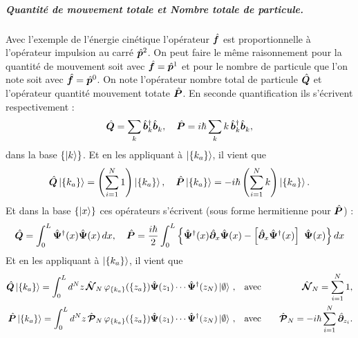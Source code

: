 \subparagraph{Quantité de mouvement totale et Nombre totale de particule. }
Avec l'exemple de l'énergie cinétique l'opérateur $\hat{\bm{f}}$ est  proportionnelle à l'opérateur impulsion au carré $\hat{\bm{p}}^2$. On peut faire le même raisonnement pour la quantité de mouvement  soit avec $\hat{\bm{f}} = \hat{\bm{p}}^1$ et pour le nombre de particule que l'on note soit avec $\hat{\bm{f}} = \hat{\bm{p}}^0$. On note l'opérateur nombre total de particule $\hat{\bm{Q}}$  et l'opérateur quantité mouvement totate $\hat{\bm{P}}$. En seconde quantification ils s'écrivent respectivement :  
\begin{equation}
	\hat{\bm{Q}} = \sum_{k}  \hat{\bm{b}}^\dagger_k \hat{\bm{b}}_k^{} , \quad  \hat{\bm{P}} = i\hbar\sum_{k} k \, \hat{\bm{b}}^\dagger_k \hat{\bm{b}}_k^{},\label{eq.chap.1.Q.P.k.1}
\end{equation}
dans la base \( \{ \ket{k} \} \). Et en les appliquant à \(\ket{\{k_a\}}\), il vient que 
\begin{eqnarray}
	\hat{\bm{Q}} \ket{\{k_a\}} = \left( \sum_{i = 1}^N 1 \right) \ket{\{k_a\}},\quad \hat{\bm{P}} \ket{\{k_a\}} = -i\hbar \left( \sum_{i = 1}^N k \right) \ket{\{k_a\}}.
\end{eqnarray}
Et dans la base \( \{ \ket{x} \} \) ces opérateurs s'écrivent (sous forme hermitienne pour $\hat{\bm{P}}$) : 
\begin{eqnarray}
	\operator{Q}  =  \int_0^L \operator{\Psi}^\dag (x) \operator{\Psi} (x) \, d x, \quad 
	\operator{P}  =  \frac{i\hbar}2 \int_0^L \left \{  \operator{\Psi}^\dag(x) \operator{\partial}_x \operator{\Psi}(x) - \left [\operator{\partial}_x \operator{\Psi}^\dag(x)\right ] \operator{\Psi}(x)\right \} dx
\end{eqnarray}
Et en les appliquant à \(\ket{\{k_a\}}\), il vient que 
\begin{eqnarray}
	\hat{\bm{Q}}\ket{ \{k_a\}} =  \int_0^L d^N z \, \hat{\bm{\mathcal{N}}}_N \, \varphi_{\{k_a\}}(\{z_a\} ) \hat{\bm{\Psi}}(z_1) \cdots \hat{\bm{\Psi}}^\dag(z_N) \ket{\emptyset}\, , \quad &\mbox{avec}& \quad \hat{\bm{\mathcal{N}}}_N = \sum_{i=1}^N 1,\\
	\hat{\bm{P}}\ket{ \{k_a\}} =  \int_0^L d^N z \, \hat{\bm{\mathcal{P}}}_N \, \varphi_{\{k_a\}}(\{z_a\} ) \hat{\bm{\Psi}}(z_1) \cdots \hat{\bm{\Psi}}^\dag(z_N) \ket{\emptyset}\, , \quad &\mbox{avec}& \quad \hat{\bm{\mathcal{P}}}_N = -i\hbar \sum_{i=1}^N \hat{\bm{\partial}}_{z_i}.
\end{eqnarray}


